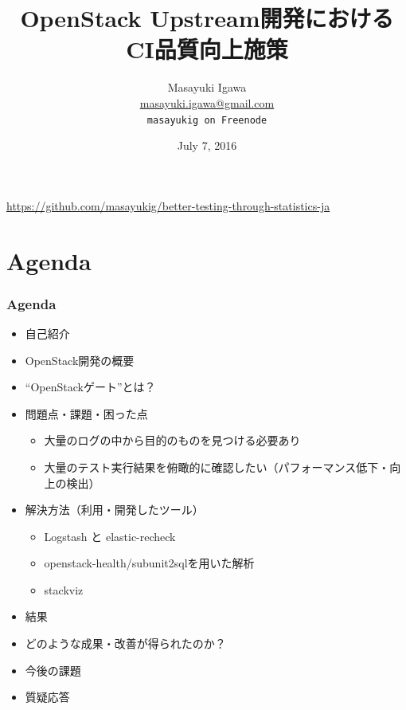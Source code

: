 \documentclass[aspectratio=169,11pt,hyperref={colorlinks=true}]{beamer}
\author[Masayuki Igawa]{%
    \texorpdfstring{%
        \centering
        Masayuki Igawa\\
        \href{mailto:masayuki.igawa@gmail.com}{masayuki.igawa@gmail.com}\\
        \texttt{masayukig on Freenode}
    }
    {Masayuki Igawa}
}
\date{July 7, 2016}
\title[OpenStack Upstream開発におけるCI品質向上施策
\hspace{2em}\insertframenumber/\inserttotalframenumber]{OpenStack Upstream開発におけるCI品質向上施策}
\begin{document}


{%
\begin{frame}[noframenumbering]
    \hypersetup{colorlinks,urlcolor=white}
    \titlepage{}
    \centering
    \href{https://github.com/masayukig/better-testing-through-statistics-ja}{https://github.com/masayukig/better-testing-through-statistics-ja}
\end{frame}
}

\section{Agenda}
\begin{frame}
    \frametitle{Agenda}
    \begin{itemize}
        \item 自己紹介
        \item OpenStack開発の概要
        \item ``OpenStackゲート''とは？
        \item 問題点・課題・困った点
          \begin{itemize}
            \item 大量のログの中から目的のものを見つける必要あり
            \item 大量のテスト実行結果を俯瞰的に確認したい（パフォーマンス低下・向上の検出）
          \end{itemize}
        \item 解決方法（利用・開発したツール）
          \begin{itemize}
            \item Logstash と elastic-recheck
            \item openstack-health/subunit2sqlを用いた解析
            \item stackviz
          \end{itemize}
        \item 結果
        \item どのような成果・改善が得られたのか？
        \item 今後の課題
        \item 質疑応答
    \end{itemize}
\end{frame}
\end{document}
